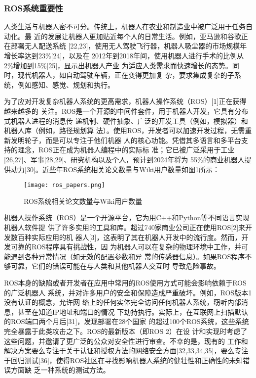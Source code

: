 \subsubsection{ROS系统重要性}
人类生活与机器人密不可分。传统上，机器人在农业和制造业中被广泛用于任务自动化。最
近的发展让机器人更加贴近每个人的日常生活。例如，亚马逊和谷歌正在部署无人配送系统
[22,23]，使用无人驾驶飞行器，机器人吸尘器的市场规模年增长率达到23\%[24]，以及在
2012年到2018年间，使用机器人进行手术的比例从2\%增加到15\%[25]，显示出机器人产业
为适应人类需求而快速增长的态势。同时，现代机器人，如自动驾驶车辆，正在变得更加复
杂，要求集成复杂的子系统，例如感知、感觉、规划和执行。

为了应对开发复杂机器人系统的更高需求，机器人操作系统（ROS）[1]正在获得越来越多的
关注。ROS是一个开源的中间件套件，用于机器人开发，它具有分布式机器人进程的消息传
递机制、硬件抽象、广泛的开发工具（例如，模拟器）和机器人库（例如，路径规划算
法）。使用ROS，开发者可以加速开发过程，无需重新发明轮子，而是可以专注于他们机器
人的核心功能。凭借其多语言和多平台支持的理念，ROS正在成为机器人编程中的实际标
准；它已被广泛采用于工业[26,27]、军事[28,29]、研究机构以及个人，预计到2024年将为
55\%的商业机器人提供动力[30]。近些年ROS系统相关论文数量与Wiki用户数量如图1所示：

\begin{figure}[H]
  \centering
  \texttt{[image: ros\_papers.png]}
  \caption{ROS系统相关论文数量与Wiki用户数量}
\end{figure}

机器人操作系统（ROS）是一个开源平台，它为用C++和Python等不同语言实现机器人软件提
供了许多实用的工具和库。超过740家商业公司正在使用ROS[2]来开发数百种实际应用的机
器人[3]，这表明了其在机器人开发中的流行度。然而，开发可靠的ROS程序具有挑战性，因
为机器人可以在复杂的物理环境中工作，并可能遇到各种异常情况（如无效的配置参数和异
常的传感器信息）。如果ROS程序不够可靠，它们的错误可能在与人类和其他机器人交互时
导致危险事故。

ROS本身的缺陷或者开发者在应用中常用的ROS使用方式可能会影响依赖于ROS的广泛机器人
系统，并对许多用户的安全和保障造成严重破坏。例如，ROS版本1没有认证的概念，允许网
络上的任何实体完全访问任何机器人系统，窃听内部消息，甚至在知道IP地址和端口的情况
下劫持执行。实际上，在互联网上扫描默认的ROS端口两个月后[31]，发现部署在28个国家
的超过100个ROS系统，这些系统完全暴露于此类攻击之下。ROS的最新版本（即ROS 2）在设
计和实现时考虑了这些问题，并邀请了更广泛的公众对安全性进行审查。不幸的是，现有的
工作和解决方案要么专注于关于认证和授权方法的网络安全方面[32,33,34,35]，要么专注
于回归测试[36]，使得ROS社区在寻找影响机器人系统的健壮性和正确性的未知错误方面缺
乏一种系统的测试方法。

